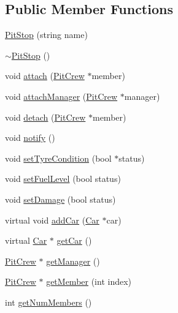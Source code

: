 \subsection*{Public Member Functions}
\begin{DoxyCompactItemize}
\item 
\mbox{\hyperlink{class_pit_stop_a6c071cb7cd700bd6cb87888fadd39086}{Pit\+Stop}} (string name)
\item 
\mbox{\hyperlink{class_pit_stop_a1315c3c8d71a3ea070ab2e05a2ff5d16}{$\sim$\+Pit\+Stop}} ()
\item 
void \mbox{\hyperlink{class_pit_stop_abf17df574e761dd36eb52d27c761ed43}{attach}} (\mbox{\hyperlink{class_pit_crew}{Pit\+Crew}} $\ast$member)
\item 
void \mbox{\hyperlink{class_pit_stop_a5c92a9c5a3f6433c84d94f4eb612dfaf}{attach\+Manager}} (\mbox{\hyperlink{class_pit_crew}{Pit\+Crew}} $\ast$manager)
\item 
void \mbox{\hyperlink{class_pit_stop_a08037efd617a3f0f36a7a69537ba2a49}{detach}} (\mbox{\hyperlink{class_pit_crew}{Pit\+Crew}} $\ast$member)
\item 
void \mbox{\hyperlink{class_pit_stop_ab5518b2a6052996fdab1a082d0b27874}{notify}} ()
\item 
void \mbox{\hyperlink{class_pit_stop_aae1894edaab6ccc3ca1d5ea18473bc47}{set\+Tyre\+Condition}} (bool $\ast$status)
\item 
void \mbox{\hyperlink{class_pit_stop_acaa67a8196e7771d5381857570768da6}{set\+Fuel\+Level}} (bool status)
\item 
void \mbox{\hyperlink{class_pit_stop_a7ae4b0e924c007026f02775a51cdd408}{set\+Damage}} (bool status)
\item 
virtual void \mbox{\hyperlink{class_pit_stop_a1e7fe0a405a2ba73c299bb5b05f19fc0}{add\+Car}} (\mbox{\hyperlink{class_car}{Car}} $\ast$car)
\item 
virtual \mbox{\hyperlink{class_car}{Car}} $\ast$ \mbox{\hyperlink{class_pit_stop_afe4eca8318260d7399f5f8c29288dc02}{get\+Car}} ()
\item 
\mbox{\hyperlink{class_pit_crew}{Pit\+Crew}} $\ast$ \mbox{\hyperlink{class_pit_stop_a5d0d8b1ce50db452fb1d22292f9d1d9d}{get\+Manager}} ()
\item 
\mbox{\hyperlink{class_pit_crew}{Pit\+Crew}} $\ast$ \mbox{\hyperlink{class_pit_stop_a83212e8030b8931a3129a565089d76ce}{get\+Member}} (int index)
\item 
int \mbox{\hyperlink{class_pit_stop_acfbfcd3895366420857b8eef5cb5eac9}{get\+Num\+Members}} ()
\item 

\end{DoxyCompactItemize}
